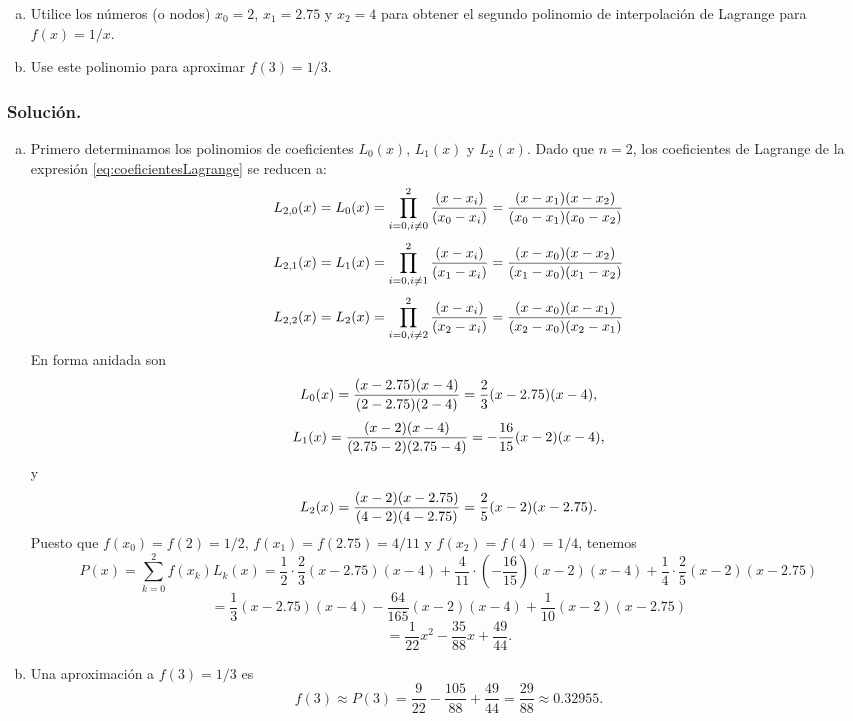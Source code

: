 \begin{example}{\rm 
		\begin{enumerate}[a)]
			\item Utilice los números (o nodos) $x_0 = 2$, $x_1 = 2.75$ y $x_2 = 4$ para obtener el segundo polinomio de interpolación de 
				Lagrange para $f(x) = 1/x$.
			\item Use este polinomio para aproximar $f(3) = 1/3$.
		\end{enumerate}
		\subsubsection*{Solución.}
		\begin{enumerate}[a)]
			\item Primero determinamos los polinomios de coeficientes $L_0(x)$, $L_1(x)$ y $L_2(x)$. 
				Dado que $n=2$, los coeficientes de Lagrange de la expresión \ref{eq:coeficientesLagrange} se reducen a:
				$$L_{2,0}(x) = L_0(x) = \prod_{i=0, i\not= 0}^{2} {(x-x_i) \over (x_0 - x_i)} = {(x-x_1)(x-x_2)\over (x_0-x_1)(x_0-x_2)}$$	
				$$L_{2,1}(x) = L_1(x) = \prod_{i=0, i\not= 1}^{2} {(x-x_i) \over (x_1 - x_i)} = {(x-x_0)(x-x_2)\over (x_1-x_0)(x_1-x_2)}$$	
				$$L_{2,2}(x) = L_2(x) = \prod_{i=0, i\not= 2}^{2} {(x-x_i) \over (x_2 - x_i)} = {(x-x_0)(x-x_1)\over (x_2-x_0)(x_2-x_1)}$$	
				En forma anidada son
				$$L_0(x) = {(x-2.75)(x-4)\over (2-2.75)(2-4)} = \frac{2}{3}(x-2.75)(x-4),$$
				$$L_1(x) = {(x-2)(x-4)\over (2.75-2)(2.75-4)} = -\frac{16}{15}(x-2)(x-4),$$
				y
				$$L_2(x) = {(x-2)(x-2.75)\over (4-2)(4-2.75)} = \frac{2}{5}(x-2)(x-2.75).$$		
				Puesto que $f(x_0) = f(2) = 1/2$, $f(x_1) = f(2.75) = 4/11$ y $f(x_2) = f(4) = 1/4$, tenemos
				$$P(x) = \sum_{k=0}^2 f(x_k)L_k(x) =  \frac{1}{2}\cdot\frac{2}{3}(x-2.75)(x-4) + \frac{4}{11}\cdot\left(-\frac{16}{15}\right)(x-2)(x-4) + 
				\frac{1}{4}\cdot\frac{2}{5}(x-2)(x-2.75) $$
				$$ = \frac{1}{3}(x-2.75)(x-4) - \frac{64}{165}(x-2)(x-4) + \frac{1}{10}(x-2)(x-2.75)$$
				$$ = \frac{1}{22}x^2 - \frac{35}{88}x + \frac{49}{44}.$$
			\item Una aproximación a $f(3) = 1/3$ es
				$$f(3) \approx P(3) = \frac{9}{22} - \frac{105}{88} + \frac{49}{44} = \frac{29}{88} \approx 0.32955.$$
		\end{enumerate}
}\end{example}


